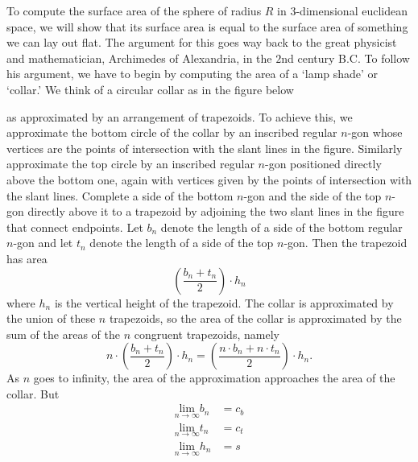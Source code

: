 \documentclass{ximera}
\begin{document}
To compute the surface area of the sphere of radius $R$ in $3$-dimensional
euclidean space, we will show that its surface area is equal to the surface
area of something we can lay out flat. The argument for this goes way back to
the great physicist and mathematician, Archimedes of Alexandria, in the $2$nd
century B.C. To follow his argument, we have to begin by computing the area of
a `lamp shade' or `collar.' We think of a circular collar as in the figure
below%
\begin{image}
\end{image}
as approximated by an arrangement of trapezoids. To achieve this, we
approximate the bottom circle of the collar by an inscribed regular $n$-gon
whose vertices are the points of intersection with the slant lines in the
figure. Similarly approximate the top circle by an inscribed regular $n$-gon
positioned directly above the bottom one, again with vertices given by the
points of intersection with the slant lines. Complete a side of the bottom
$n$-gon and the side of the top $n$-gon directly above it to a trapezoid by
adjoining the two slant lines in the figure that connect endpoints. Let
$b_{n}$ denote the length of a side of the bottom regular $n$-gon and let
$t_{n}$ denote the length of a side of the top $n$-gon. Then the trapezoid has
area%
\[
\left(  \frac{b_{n}+t_{n}}{2}\right)  \cdot h_{n}%
\]
where $h_{n}$ is the vertical height of the trapezoid. The collar is
approximated by the union of these $n$ trapezoids, so the area of the collar
is approximated by the sum of the areas of the $n$ congruent trapezoids,
namely%
\[
n\cdot \left(  \frac{b_{n}+t_{n}}{2}\right)
\cdot h_{n}=\left(  \frac{n\cdot %
b_{n}+n\cdot t_{n}}{2}\right) \cdot h_{n}.
\]
As $n$ goes to infinity, the area of the approximation approaches the area of
the collar. But
\begin{align*}
\underset{n\rightarrow\infty}{\mathrm{lim}}b_{n}  &  =c_{b}\\
\underset{n\rightarrow\infty}{\mathrm{lim}}t_{n}  &  =c_{t}\\
\underset{n\rightarrow\infty}{\mathrm{lim}}h_{n}  &  =s
\end{align*}
\end{document}
